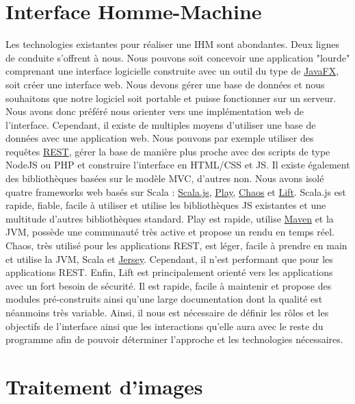 \section{Interface Homme-Machine}

Les technologies existantes pour réaliser une IHM sont abondantes. Deux lignes de conduite s’offrent à nous. Nous pouvons
soit concevoir une application "lourde" comprenant une interface logicielle construite avec un outil du type de
\href{https://fr.wikipedia.org/wiki/JavaFX}{JavaFX}, soit créer une interface web. Nous devons gérer une base de données et
nous souhaitons que notre logiciel soit portable et puisse fonctionner sur un serveur. Nous avons donc préféré nous orienter
vers une implémentation web de l’interface. Cependant, il existe de multiples moyens d’utiliser une base de données avec une
application web. Nous pouvons par exemple utiliser des requêtes \href{https://en.wikipedia.org/wiki/Representational_state_transfer}{REST},
gérer la base de manière plus proche avec des scripts de type NodeJS ou PHP et construire l’interface en HTML/CSS et JS.
Il existe également des bibliothèques basées sur le modèle MVC, d’autres non. Nous avons isolé quatre frameworks web basés sur Scala :
\href{http://www.scala-js.org/}{Scala.js}, \href{https://www.playframework.com/}{Play},
\href{https://sourceforge.net/p/chaosuiframework/wiki/Home/}{Chaos} et \href{https://www.liftweb.net/}{Lift}. Scala.js est rapide,
fiable, facile à utiliser et utilise les bibliothèques JS existantes et une multitude d’autres bibliothèques standard.
Play est rapide, utilise \href{http://maven.apache.org/}{Maven} et la JVM, possède une communauté très active et propose un
rendu en temps réel. Chaos, très utilisé pour les applications REST, est léger, facile à prendre en main et utilise la JVM,
Scala et \href{https://jersey.github.io/}{Jersey}. Cependant, il n’est performant que pour les applications REST.
Enfin, Lift est principalement orienté vers les applications avec un fort besoin de sécurité. Il est rapide, facile à maintenir et
propose des modules pré-construits ainsi qu’une large documentation dont la qualité est néanmoins très variable. Ainsi, il nous
est nécessaire de définir les rôles et les objectifs de l’interface ainsi que les interactions qu’elle aura avec le reste du
programme afin de pouvoir déterminer l’approche et les technologies nécessaires.

\section{Traitement d’images}

